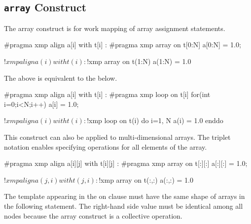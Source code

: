 \subsection{{\tt array} Construct}

The array construct is for work mapping of array assignment statements.

\begin{XCexample}
#pragma xmp align a[i] with t[i]
  :
#pragma xmp array on t[0:N]
a[0:N] = 1.0;
\end{XCexample}

\begin{XFexample}
!$xmp align a(i) with t(i)
  :
!$xmp array on t(1:N)
a(1:N) = 1.0
\end{XFexample}

The above is equivalent to the below.

\begin{XCexample}
#pragma xmp align a[i] with t[i]
  :
#pragma xmp loop on t[i]
for(int i=0;i<N;i++)
  a[i] = 1.0;
\end{XCexample}

\begin{XFexample}
!$xmp align a(i) with t(i)
  :
!$xmp loop on t(i)
do i=1, N
  a(i) = 1.0
enddo
\end{XFexample}

This construct can also be applied to multi-dimensional arrays. The
triplet notation enables specifying operations for all elements of the
array.

\begin{XCexample}
#pragma xmp align a[i][j] with t[i][j]
  :
#pragma xmp array on t[:][:]
a[:][:] = 1.0;
\end{XCexample}

\begin{XFexample}
!$xmp align a(j,i) with t(j,i)
  :
!$xmp array on t(:,:)
a(:,:) = 1.0
\end{XFexample}

\begin{mynote}
The template appearing in the on clause must have
the same shape of
arrays in the following statement. The right-hand side value must be
identical among all nodes because the array construct is a collective
operation.
\end{mynote}
